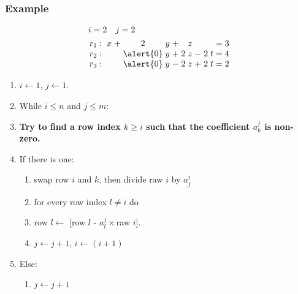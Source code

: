 \documentclass{beamer}
\begin{document}
\begin{frame}
  \frametitle{Example}
  
  \[\arraycolsep=1.4pt
  \begin{aligned}
    &i = 2 \quad j = 2\\
      &
    \begin{array}{lcccccccccccccc}
        r_1  & : &  & x & + & 2 & y & + &  & z &  & & & = & 3\\
        r_2 & : &   &   &  &  \alert{0} & y & + & 2 & z & - & 2 & t  & = & 4\\
        r_3  & : &  &   &  & \alert{0}  & y  & - & 2 & z & + & 2 & t & = & 2\\
    \end{array}
  \end{aligned}
  \]
  
  
  \begin{enumerate}
  \item $i \leftarrow 1$, $j \leftarrow 1$.
  \item While $i \le n$ and $j \le m$:
  \item {\bf Try to find a row index $k \ge i$ such that the coefficient $a^j_k$ is non-zero.}
  \item If there is one:
    \begin{enumerate}
    \item swap row $i$ and $k$, then divide raw $i$ by $a^{j}_j$
    \item for every row index $l \neq i$ do 
    \item row $l \leftarrow$ [row $l$ - $a^j_l\times$raw $i$].
    \item $j \leftarrow j+1$, $i \leftarrow (i+1)$
    \end{enumerate}
  \item Else:
    \begin{enumerate}
    \item $j \leftarrow j+1$
    \end{enumerate}
  \end{enumerate}
  
\end{frame}
\end{document}
